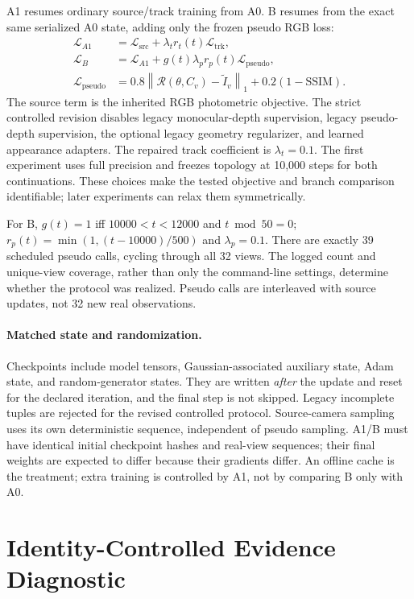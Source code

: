 \documentclass[10pt,twocolumn,letterpaper]{article}
\newcommand{\norm}[1]{\left\lVert#1\right\rVert}
\newcommand{\cL}{\mathcal{L}}
\begin{document}
A1 resumes ordinary source/track training from A0. B resumes from the exact same serialized A0 state, adding only the frozen pseudo RGB loss:
\begin{align}
\cL_{A1}&=\cL_{\mathrm{src}}+\lambda_t r_t(t)\cL_{\mathrm{trk}},\\
\cL_B&=\cL_{A1}+g(t)\lambda_p r_p(t)\cL_{\mathrm{pseudo}},\\
\cL_{\mathrm{pseudo}}&=0.8\norm{\mathcal R(\theta,C_v)-\widetilde I_v}_1
+0.2(1-\mathrm{SSIM}).
\label{eq:lossb}
\end{align}
The source term is the inherited RGB photometric objective. The strict controlled revision disables legacy monocular-depth supervision, legacy pseudo-depth supervision, the optional legacy geometry regularizer, and learned appearance adapters. The repaired track coefficient is $\lambda_t=0.1$. The first experiment uses full precision and freezes topology at 10,000 steps for both continuations. These choices make the tested objective and branch comparison identifiable; later experiments can relax them symmetrically.

For B, $g(t)=1$ iff $10000<t<12000$ and $t\bmod50=0$; $r_p(t)=\min(1,(t-10000)/500)$ and $\lambda_p=0.1$. There are exactly 39 scheduled pseudo calls, cycling through all 32 views. The logged count and unique-view coverage, rather than only the command-line settings, determine whether the protocol was realized. Pseudo calls are interleaved with source updates, not 32 new real observations.

\paragraph{Matched state and randomization.} Checkpoints include model tensors, Gaussian-associated auxiliary state, Adam state, and random-generator states. They are written \emph{after} the update and reset for the declared iteration, and the final step is not skipped. Legacy incomplete tuples are rejected for the revised controlled protocol. Source-camera sampling uses its own deterministic sequence, independent of pseudo sampling. A1/B must have identical initial checkpoint hashes and real-view sequences; their final weights are expected to differ because their gradients differ. An offline cache is the treatment; extra training is controlled by A1, not by comparing B only with A0.

\section{Identity-Controlled Evidence Diagnostic}
\end{document}
